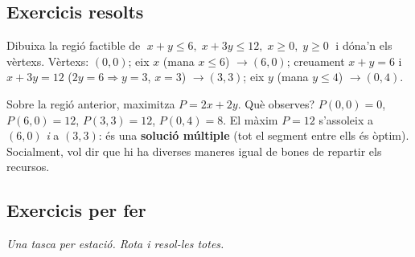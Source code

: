 \subsection{Exercicis resolts}

\begin{exresolt}
Dibuixa la regió factible de $\;x+y\le 6,\;x+3y\le 12,\;x\ge 0,\;y\ge 0\;$ i dóna'n
els vèrtexs.
\solucio
Vèrtexs: $(0,0)$; eix $x$ (mana $x\le 6$) $\rightarrow (6,0)$; creuament $x+y=6$ i
$x+3y=12$ ($2y=6\Rightarrow y=3$, $x=3$) $\rightarrow (3,3)$; eix $y$ (mana $y\le 4$)
$\rightarrow (0,4)$.

\begin{center}
\end{center}
\end{exresolt}

\begin{exresolt}
Sobre la regió anterior, maximitza $P=2x+2y$. Què observes?
\solucio
$P(0,0)=0$, $P(6,0)=12$, $P(3,3)=12$, $P(0,4)=8$. El màxim $P=12$ s'assoleix a
$(6,0)$ \emph{i} a $(3,3)$: és una \textbf{solució múltiple} (tot el segment entre
ells és òptim). Socialment, vol dir que hi ha diverses maneres igual de bones de
repartir els recursos.
\end{exresolt}

\subsection{Exercicis per fer}

\noindent\textit{Una tasca per estació. Rota i resol-les totes.}

